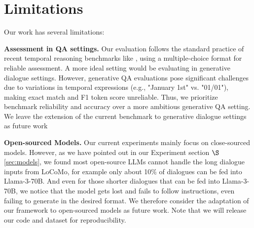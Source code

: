\section{Limitations}
Our work has several limitations:

\noindent\textbf{Assessment in QA settings.} Our evaluation follows the standard practice of recent temporal reasoning benchmarks like \cite{zhou2019going, wang-zhao-2024-tram}, using a multiple-choice format for reliable assessment. A more ideal setting would be evaluating in generative dialogue settings. However, generative QA evaluations pose significant challenges due to variations in temporal expressions (e.g., "January 1st" vs. "01/01"), making exact match and F1 token score unreliable. Thus, we prioritize benchmark reliability and accuracy over a more ambitious generative QA setting. We leave the extension of the current benchmark to generative dialogue settings as future work

\noindent\textbf{Open-sourced Models.} Our current experiments mainly focus on close-sourced models. However, as we have pointed out in our Experiment section $\S$ \ref{sec:models}, we found most open-source LLMs cannot handle the long dialogue inputs from LoCoMo, for example only about 10\% of dialogues can be fed into Llama-3-70B. And even for those shorter dialogues that can be fed into Llama-3-70B, we notice that the model gets lost and fails to follow instructions, even failing to generate in the desired format. We therefore consider the adaptation of our framework to open-sourced models as future work. Note that we will release our code and dataset for reproducibility.

